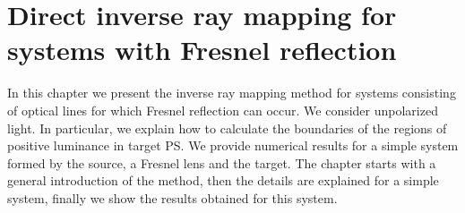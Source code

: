 \chapter{Direct inverse ray mapping for systems with Fresnel reflection}
\label{chap:fresnel}

In this chapter we present the inverse ray mapping method for systems consisting of optical lines for which Fresnel reflection can occur. We consider unpolarized light. In particular, we explain how to calculate the boundaries of the regions of positive luminance in target PS. We provide numerical results for a simple system formed by the source, a Fresnel lens and the target. 
The chapter starts with a general introduction of the method, then the details are explained for a simple system, finally we show the results obtained for this system.

